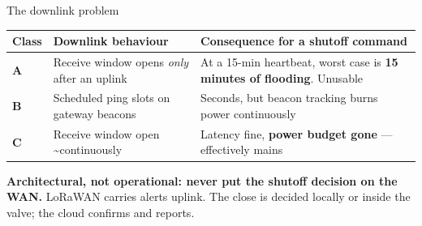 \documentclass[aspectratio=169,t,10pt,xcolor={table,svgnames}]{beamer}
\newcommand{\hd}[1]{\textbf{\footnotesize #1}}
\begin{document}
\begin{frame}{The downlink problem}
  \scriptsize
  \begin{tabular}{@{}p{}p{}p{}@{}}
    \toprule
    \hd{Class} & \hd{Downlink behaviour} & \hd{Consequence for a shutoff command} \\
    \midrule
    \textbf{A} & Receive window opens \emph{only} after an uplink & \cellcolor{fill2}At a 15-min heartbeat, worst case is \textbf{15 minutes of flooding}. Unusable \\
    \textbf{B} & Scheduled ping slots on gateway beacons & Seconds, but beacon tracking burns power continuously \\
    \textbf{C} & Receive window open \textasciitilde continuously & Latency fine, \textbf{power budget gone} --- effectively mains \\
    \bottomrule
  \end{tabular}
  \vspace{0.9em}
  \begin{center}
  \end{center}
  \vspace{0.3em}
  \begin{beamercolorbox}[wd=\textwidth,sep=1.4ex]{}
    \color{ink}\small \textbf{Architectural, not operational: never put the shutoff decision on the
    WAN.} LoRaWAN carries alerts uplink. The close is decided locally or inside the valve; the cloud
    confirms and reports.
  \end{beamercolorbox}
\end{frame}
\end{document}
